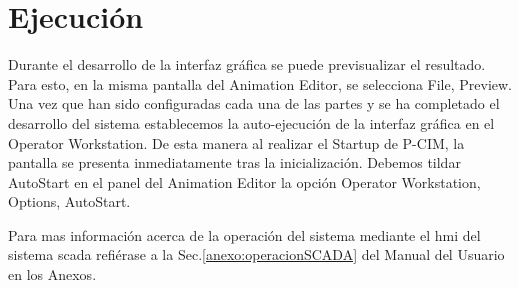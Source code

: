 

\section{Ejecución}
\label{sec:Ejecucion}
Durante el desarrollo de la interfaz gráfica se puede previsualizar 
el resultado. Para esto, en la misma pantalla del Animation Editor,
se selecciona File, Preview. Una vez que han sido configuradas cada una de las 
partes y se ha completado el desarrollo del sistema establecemos
la auto-ejecución de la interfaz gráfica en el Operator Workstation. De esta 
manera al realizar el Startup de P-CIM, la pantalla se presenta inmediatamente 
tras la inicialización. Debemos tildar AutoStart en el panel del Animation 
Editor la opción Operator Workstation, Options, AutoStart.

Para mas información acerca de la operación del sistema mediante el \gls{hmi} 
del sistema \gls{scada} refiérase a la Sec.\ref{anexo:operacionSCADA} del 
Manual del Usuario en los Anexos.
